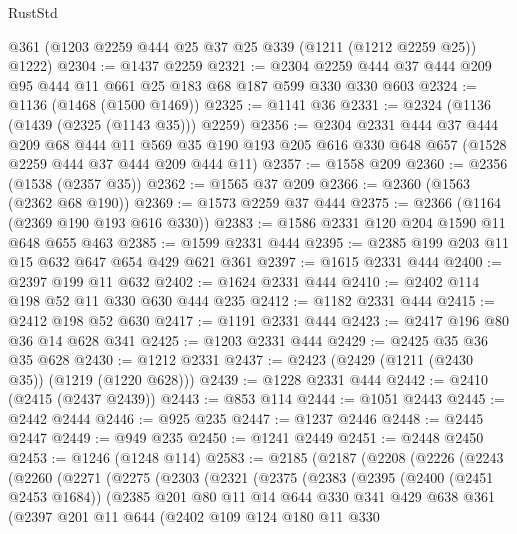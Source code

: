 \begin{lexlean}{RustStd}
\begin{coremodule}
{\begin{coremodule}
{{{{{{{{    @361
    (@1203 @2259 @444 @25 @37 @25 @339 (@1211 (@1212 @2259 @25)) @1222)
@2304 := @1437 @2259
@2321 := @2304 @2259 @444 @37 @444 @209 @95 @444 @11 @661 @25 @183 @68 @187 @599 @330 @330 @603
@2324 := @1136 (@1468 (@1500 @1469))
@2325 := @1141 @36
@2331 := @2324 (@1136 (@1439 (@2325 (@1143 @35))) @2259)
@2356 := @2304
    @2331
    @444
    @37
    @444
    @209
    @68
    @444
    @11
    @569
    @35
    @190
    @193
    @205
    @616
    @330
    @648
    @657
    (@1528 @2259 @444 @37 @444 @209 @444 @11)
@2357 := @1558 @209
@2360 := @2356 (@1538 (@2357 @35))
@2362 := @1565 @37 @209
@2366 := @2360 (@1563 (@2362 @68 @190))
@2369 := @1573 @2259 @37 @444
@2375 := @2366 (@1164 (@2369 @190 @193 @616 @330))
@2383 := @1586 @2331 @120 @204 @1590 @11 @648 @655 @463
@2385 := @1599 @2331 @444
@2395 := @2385 @199 @203 @11 @15 @632 @647 @654 @429 @621 @361
@2397 := @1615 @2331 @444
@2400 := @2397 @199 @11 @632
@2402 := @1624 @2331 @444
@2410 := @2402 @114 @198 @52 @11 @330 @630 @444 @235
@2412 := @1182 @2331 @444
@2415 := @2412 @198 @52 @630
@2417 := @1191 @2331 @444
@2423 := @2417 @196 @80 @36 @14 @628 @341
@2425 := @1203 @2331 @444
@2429 := @2425 @35 @36 @35 @628
@2430 := @1212 @2331
@2437 := @2423 (@2429 (@1211 (@2430 @35)) (@1219 (@1220 @628)))
@2439 := @1228 @2331 @444
@2442 := @2410 (@2415 (@2437 @2439))
@2443 := @853 @114
@2444 := @1051 @2443
@2445 := @2442 @2444
@2446 := @925 @235
@2447 := @1237 @2446
@2448 := @2445 @2447
@2449 := @949 @235
@2450 := @1241 @2449
@2451 := @2448 @2450
@2453 := @1246 (@1248 @114)
@2583 := @2185
    (@2187
      (@2208
        (@2226
          (@2243
            (@2260
              (@2271
                (@2275
                  (@2303
                    (@2321
                      (@2375
                        (@2383
                          (@2395
                            (@2400 (@2451 @2453 @1684))
                            (@2385
                              @201
                              @80
                              @11
                              @14
                              @644
                              @330
                              @341
                              @429
                              @638
                              @361
                              (@2397
                                @201
                                @11
                                @644
                                (@2402
                                  @109
                                  @124
                                  @180
                                  @11
                                  @330
}}}}}}}}
\end{coremodule}}
\end{coremodule}
\end{lexlean}
